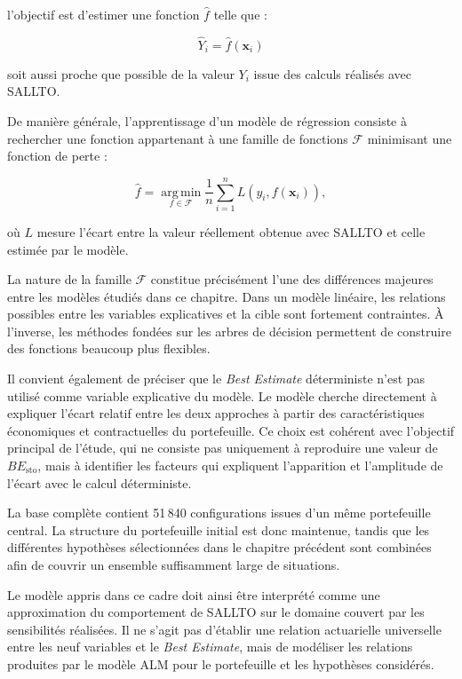 l'objectif est d'estimer une fonction $\widehat{f}$ telle que :

\begin{equation}
    \widehat{Y}_i
    =
    \widehat{f}(\mathbf{x}_i)
\end{equation}

soit aussi proche que possible de la valeur $Y_i$ issue des calculs réalisés avec SALLTO.

De manière générale, l'apprentissage d'un modèle de régression consiste à rechercher une fonction appartenant à une famille de fonctions $\mathcal{F}$ minimisant une fonction de perte :

\begin{equation}
    \widehat{f}
    =
    \underset{f \in \mathcal{F}}{\operatorname{arg\,min}}
    \frac{1}{n}
    \sum_{i=1}^{n}
    L
    \left(
    y_i,
    f(\mathbf{x}_i)
    \right),
    \label{eq:empirical_risk}
\end{equation}

où $L$ mesure l'écart entre la valeur réellement obtenue avec SALLTO et celle estimée par le modèle.

La nature de la famille $\mathcal{F}$ constitue précisément l'une des différences majeures entre les modèles étudiés dans ce chapitre. Dans un modèle linéaire, les relations possibles entre les variables explicatives et la cible sont fortement contraintes. À l'inverse, les méthodes fondées sur les arbres de décision permettent de construire des fonctions beaucoup plus flexibles.

Il convient également de préciser que le \textit{Best Estimate} déterministe n'est pas utilisé comme variable explicative du modèle. Le modèle cherche directement à expliquer l'écart relatif entre les deux approches à partir des caractéristiques économiques et contractuelles du portefeuille. Ce choix est cohérent avec l'objectif principal de l'étude, qui ne consiste pas uniquement à reproduire une valeur de $BE_{\mathrm{sto}}$, mais à identifier les facteurs qui expliquent l'apparition et l'amplitude de l'écart avec le calcul déterministe.

La base complète contient 51\,840 configurations issues d'un même portefeuille central. La structure du portefeuille initial est donc maintenue, tandis que les différentes hypothèses sélectionnées dans le chapitre précédent sont combinées afin de couvrir un ensemble suffisamment large de situations.

Le modèle appris dans ce cadre doit ainsi être interprété comme une approximation du comportement de SALLTO sur le domaine couvert par les sensibilités réalisées. Il ne s'agit pas d'établir une relation actuarielle universelle entre les neuf variables et le \textit{Best Estimate}, mais de modéliser les relations produites par le modèle ALM pour le portefeuille et les hypothèses considérés.



